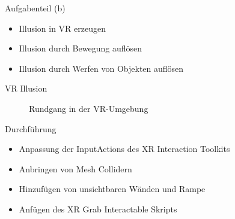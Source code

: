 \documentclass{beamer}
\begin{document}
\begin{frame}{Aufgabenteil (b)}
\begin{itemize}
\item Illusion in VR erzeugen
\item Illusion durch Bewegung auflösen
\item Illusion durch Werfen von Objekten auflösen
\end{itemize}
\end{frame}


\begin{frame}{VR Illusion}
\begin{figure}
    \centering
\caption{Rundgang in der VR-Umgebung}
\end{figure}
\end{frame}


\begin{frame}{Durchführung}
\begin{itemize}
\item Anpassung der InputActions des XR Interaction Toolkits
\item Anbringen von Mesh Collidern
\item Hinzufügen von unsichtbaren Wänden und Rampe
\item Anfügen des XR Grab Interactable Skripts
\end{itemize}
\end{frame}
\end{document}
